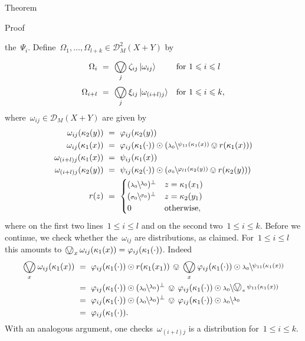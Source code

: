 \documentclass[b]{subfiles}
\begin{document}
\begin{parsec}
\begin{point}{Theorem}
\begin{point}{Proof}
\begin{point}
    the~$\Psi_i$.
Define~$\Omega_1, \ldots, \Omega_{l+k} \in \mathcal{D}_M^2 (X+Y)$ by
\begin{align*}
    \Omega_i  &\ = \ \bigovee_j\zeta_{ij} \ket{\omega_{ij}}
        &&\text{for $1 \leq i \leq l$}
    \\
    \Omega_{i+l}  &\ = \ \bigovee_j \xi_{ij} \ket{\omega_{(i+l)j}}
        &&\text{for $1 \leq i \leq k$,}
\end{align*}
where~$\omega_{ij} \in \mathcal{D}_M(X+Y)$
are given by
\begin{align*}
    \omega_{ij} (\kappa_2 (y)) &\ =\ \varphi_{ij}(\kappa_2(y))  \\
    \omega_{ij} (\kappa_1(x)) &\ = \ 
    \varphi_{ij}(\kappa_1(\cdot))\odot
    ( \rfrac{\psi_{11}(\kappa_1(x))}{\lambda_0}
    \ovee r(\kappa_1(x)))
    \\
    \omega_{(i+l)j} (\kappa_1(x)) &\ =\ \psi_{ij}(\kappa_1(x)) \\
    \omega_{(i+l)j} (\kappa_2 (y)) &\ =\ 
    \psi_{ij}(\kappa_2(\cdot)) \odot (
    \rfrac{\varphi_{l1}(\kappa_2(y))}{\sigma_0}
    \ovee r(\kappa_2(y))) \\
    r(z) & \ = \ 
    \begin{cases}
        (\rfrac{\lambda_0}{\lambda_0})^\perp & z = \kappa_1(x_1) \\
        (\rfrac{\sigma_0}{\sigma_0})^\perp & z = \kappa_2(y_1) \\
        0 & \text{otherwise},
    \end{cases}
\end{align*}
    where on the first two lines~$1 \leq i \leq l$
    and on the second two~$1 \leq i \leq k$.
Before we continue, we check whether the~$\omega_{ij}$
    are distributions, as claimed.
For~$1 \leq i \leq l$
    this amounts to $\bigovee_x \omega_{ij}(\kappa_1(x))
= \varphi_{ij}(\kappa_1(\cdot))$.
Indeed
\begin{align*}
\bigovee_x
    \omega_{ij}(\kappa_1(x))
    & \  =\  \varphi_{ij}(\kappa_1(\cdot)) \odot r(\kappa_1(x_1))
            \,\ovee\, \bigovee_x 
        \varphi_{ij}(\kappa_1(\cdot)) \odot
        \rfrac{\psi_{11}(\kappa_1(x))}{\lambda_0} \\
        & \  =\  \varphi_{ij}(\kappa_1(\cdot)) \odot (\rfrac{\lambda_0}{\lambda_0})^\perp
            \,\ovee \,
        \varphi_{ij}(\kappa_1(\cdot)) \odot
        \rfrac{\bigovee_x \psi_{11}(\kappa_1(x))}{\lambda_0} \\
        & \  =\  \varphi_{ij}(\kappa_1(\cdot)) \odot (\rfrac{\lambda_0}{\lambda_0})^\perp
            \,\ovee \,
        \varphi_{ij}(\kappa_1(\cdot)) \odot
        \rfrac{\lambda_0}{\lambda_0} \\
        & \  =\  \varphi_{ij}(\kappa_1(\cdot)).
\end{align*}
With an analogous argument, one checks~$\omega_{(i+l)j}$
    is a distribution for~$1 \leq i \leq k$.


\end{point}
\end{point}
\end{point}
\end{parsec}
\end{document}
